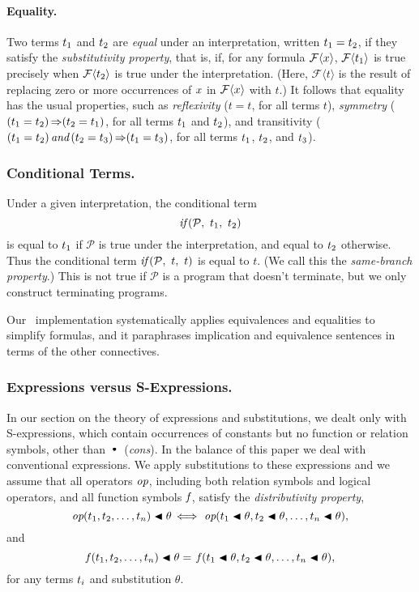 \documentclass[runningheads]{llncs}
\DeclareMathOperator{\uand}{\emph{and}\,}
\DeclareMathOperator{\uf}{\emph{f}\,}
\DeclareMathOperator{\uimplies}{\Rightarrow}
\DeclareMathOperator{\uiff}{\iff}
\begin{document}
  \paragraph{Equality.}  
   Two terms ${t}_{1}$ and ${t}_{2}$ are \emph{equal} under an interpretation, written ${t}_{1} = {t}_{2}$, if they satisfy the \emph{substitutivity property}, that is, if, for any formula $\mathcal{F}\langle x\rangle$,  $\mathcal{F}\langle{t}_{1}\rangle$ is true precisely when  $\mathcal{F}\langle{t}_{2}\rangle$ is true under the interpretation. (Here,  $\mathcal{F}\langle t\rangle$ is the result of replacing zero or more occurrences of $x$ in  $\mathcal{F}\langle x\rangle$ with $t$.) It follows that equality has the usual properties, such as \emph{reflexivity} ($t = t$, for all terms $t$), \emph{symmetry} ($(\expsub{t}{1} = \expsub{t}{2}) \uimplies (\expsub{t}{2} = \expsub{t}{1})$, for all terms ${t}_{1}$ and ${t}_{2}$), and transitivity ($(\expsub{t}{1} = \expsub{t}{2}) \uand (\expsub{t}{2} = \expsub{t}{3}) \uimplies (\expsub{t}{1} = \expsub{t}{3})$, for all terms  ${t}_{1}$, ${t}_{2}$, and ${t}_{3}$).
   
   \subsubsection{Conditional Terms.} Under a given interpretation, the conditional term \[\emph{if}\,( {\mathcal{P}},\allowbreak \ {{t}_{1}},\allowbreak \ {{t}_{2}})\] is equal to ${t}_{1}$ if $\mathcal{P}$ is true under the interpretation, and equal to ${t}_{2}$ otherwise. Thus the conditional term $\emph{if}\,( {\mathcal{P}},\allowbreak \ {t},\allowbreak \ {t})$ is equal to $t$. (We call this the \emph{same-branch property}.) This is not true if $\mathcal{P}$ is a program that doesn't terminate, but we only construct terminating programs.
   
   Our \SNARK\ implementation systematically applies equivalences and equalities to simplify formulas, and it paraphrases implication and equivalence sentences in terms of the other connectives.
   
 
    \subsubsection{Expressions versus S-Expressions.} In our section on the theory of expressions and substitutions, we dealt only with S-expressions, which contain occurrences of constants but no function or relation symbols, other than $\cons$ (\emph{cons}). In the balance of this paper we deal with conventional expressions.  We apply substitutions to these expressions and we assume that all operators $\emph{op}$, including both relation symbols and logical operators, and all function symbols $\uf$, satisfy the \emph{distributivity  property},  
    \[\emph{op}(\expsub{t}{1}, \expsub{t}{2}, \ldots, \expsub{t}{n})\apply \theta \uiff \, \emph{op}(\expsub{t}{1}\apply \theta, \expsub{t}{2}\apply \theta, \ldots, \expsub{t}{n}\apply \theta),\]
    \noindent and 
     \[\uf(\expsub{t}{1}, \expsub{t}{2}, \ldots, \expsub{t}{n})\apply \theta = \, \uf(\expsub{t}{1}\apply \theta, \expsub{t}{2}\apply \theta, \ldots, \expsub{t}{n}\apply \theta),\] for any terms ${t}_{i}$ and substitution $\theta$. 
\end{document}
